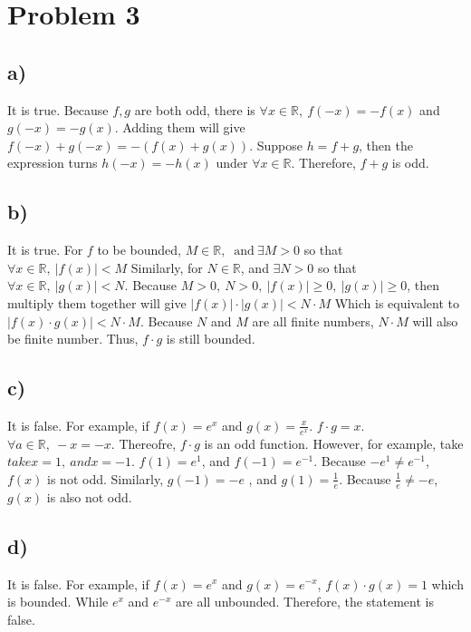 \documentclass[a4paper,fleqn]{article}
\begin{document}
\section*{Problem 3}
    \subsection*{a)}
    It is true.
        Because \(f,g\) are both odd, there is \(\forall x\in \mathbb{R}, \ f(-x)=-f(x)\) and \(g(-x)=-g(x)\). 
        Adding them will give \(f(-x)+g(-x)=-\left(f(x)+g(x)\right)\). Suppose \(h=f+g\), then the expression 
        turns \(h(-x)=-h(x)\) under \(\forall x \in \mathbb{R}\). Therefore, \(f+g\) is odd.
    \subsection*{b)}
    It is true.
        For \(f\) to be bounded, \(M\in \mathbb{R}, \ \text{ and} \ \exists M > 0\) so that \(\forall x \in \mathbb{R}, \ \left | f(x) \right | < M\)
        Similarly, for \(N\in \mathbb{R}\), and \(\exists N>0\) so that \(\forall x\in \mathbb{R}, \ |g(x)|<N\).
        Because \(M>0,\ N>0,\ |f(x)|\geqslant 0,\ |g(x)| \geqslant 0\), then multiply them together will give \(|f(x)|\cdot |g(x)|<N\cdot M\) Which is 
        equivalent to \(|f(x)\cdot g(x)|<N\cdot M\). Because \(N\) and \(M\) are all finite numbers, \(N\cdot M\) will also be finite number. Thus, \(f\cdot g\) is still bounded.
    \subsection*{c)}
    It is false.
        For example, if \(f(x)=e^x\) and \(g(x)=\frac x {e^x}\). \(f\cdot g = x\). \(\forall a \in \mathbb{R}, \ 
        -x = -x \). Thereofre, \(f\cdot g\) is an odd function. However, for example, take\(take x=1, \ and x=-1\). 
        \(f(1)=e^1\), and \(f(-1)=e^{-1}\). Because \(-e^1 \neq e^{-1}\), \(f(x)\) is not odd. Similarly, \(g(-1)=-e\)
        , and \(g(1)=\frac 1 e\). Because \(\frac 1 e \neq -e\), \(g(x)\) is also not odd.
    \subsection*{d)}
    It is false.
        For example, if \(f(x)=e^x\) and \(g(x) = e^{-x}\), \(f(x)\cdot g(x) = 1\) which is bounded. While  \(e^x\) and \(e^{-x}\) are all unbounded.
        Therefore, the statement is false.
\end{document}
